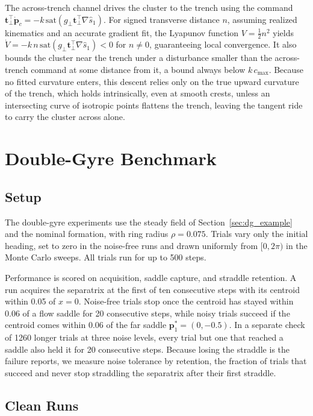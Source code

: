 \documentclass[lettersize,journal]{IEEEtran}
\begin{document}
The across-trench channel drives the cluster to the trench using the
command $\mathbf{t}_\perp^\top\dot{\mathbf{p}}_c =
-k\,\mathrm{sat}(g_\perp\mathbf{t}_\perp^\top\nabla\hat{s}_1)$. For signed
transverse distance $n$, assuming realized kinematics and an accurate
gradient fit, the Lyapunov function $V = \tfrac{1}{2}n^2$ yields
$\dot{V} = -k\,n\,\mathrm{sat}(g_\perp\mathbf{t}_\perp^\top\nabla\hat{s}_1) < 0$
for $n \neq 0$, guaranteeing local convergence. It also bounds the
cluster near the trench under a disturbance smaller than the across-trench
command at some distance from it, a bound always below $k\,c_{\max}$. Because no fitted curvature
enters, this descent relies only on the true upward curvature of the
trench, which holds intrinsically, even at smooth crests, unless an
intersecting curve of isotropic points flattens the trench, leaving the
tangent ride to carry the cluster across alone.


\section{Double-Gyre Benchmark}
\label{sec:dg_bench}

\subsection{Setup}

The double-gyre experiments use the steady field of
Section~\ref{sec:dg_example} and the nominal formation, with ring radius
$\rho = 0.075$. Trials vary only the initial heading, set to zero in the
noise-free runs and drawn uniformly from $[0, 2\pi)$ in the Monte Carlo
sweeps. All trials run for up to 500 steps.

Performance is scored on acquisition, saddle capture, and straddle
retention. A run acquires the separatrix at the first of ten consecutive
steps with its centroid within 0.05 of $x = 0$. Noise-free trials stop once
the centroid has stayed within 0.06 of a flow saddle for 20 consecutive
steps, while noisy trials succeed if the centroid comes within 0.06 of the
far saddle $\mathbf{p}^*_1 = (0, -0.5)$. In a separate check of 1260 longer
trials at three noise levels, every trial but one that reached a saddle
also held it for 20 consecutive steps. Because losing the straddle is the
failure \cite{26} reports, we measure noise tolerance by retention, the
fraction of trials that succeed and never stop straddling the separatrix
after their first straddle.

\subsection{Clean Runs}
\label{sec:disc_clean}
\end{document}
